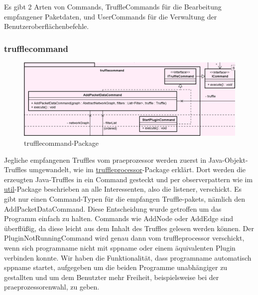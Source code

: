 Es gibt 2 Arten von Commands, TruffleCommands für die Bearbeitung empfangener
Paketdaten, und UserCommands für die Verwaltung der Benutzeroberflächenbefehle.

      \subsubsection{trufflecommand}
      \label{subsubsec:trufflecommand}
      
      \begin{figure}[H]
        \centering
        \includegraphics[width=\textwidth]{../diagramimages/trufflecommand.png}
        \caption{trufflecommand-Package}
      \end{figure}
      
      \medskip
      Jegliche empfangenen Truffles vom \gls{praeprozessor} werden zuerst in Java-Objekt-Truffles umgewandelt, wie
      im \hyperref[subsubsec:truffleprocessor]{truffleprocessor}-Package erklärt. Dort
      werden die erzeugten Java-Truffles in ein Command gesteckt und per \gls{observerpattern}
      wie im \hyperref[subsec:util]{util}-Package beschrieben an alle Interessenten, also die \gls{listener}, verschickt.
      \newline
      \newline
      Es gibt nur einen Command-Typen für die empfangen Truffle-\glspl{paket}, nämlich den
      AddPacketDataCommand. Diese Entscheidung wurde getroffen um das Programm einfach
      zu halten. Commands wie AddNode oder AddEdge sind überflüßig, da diese leicht aus
      dem Inhalt des Truffles gelesen werden können.
      \newline
      \newline
      Der PluginNotRunningCommand wird genau dann vom truffleprocessor verschickt, wenn sich \gls{programname}
      nicht mit \gls{sppname} oder einem äquivalenten Plugin verbinden konnte. Wir
      haben die Funktionalität, dass \gls{programname} automatisch \gls{sppname} startet,
      aufgegeben um die beiden Programme unabhängiger zu gestallten und um dem Benutzter
      mehr Freiheit, beispielsweise bei der \gls{praeprozessor}enwahl, zu geben.

